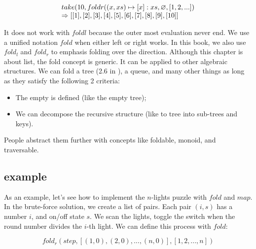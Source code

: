 \documentclass[b5paper]{article}
\begin{document}
\[
\begin{array}{l}
take(10, foldr((x, xs) \mapsto [x]:xs, \varnothing, [1, 2, ...]) \\
\Rightarrow [[1], [2], [3], [4], [5], [6], [7], [8], [9], [10]]
\end{array}
\]

It does not work with $foldl$ because the outer most evaluation never end. We use a unified notation $fold$ when either left or right works. In this book, we also use $fold_l$ and $fold_r$ to emphasis folding over the direction. Although this chapter is about list, the fold concept is generic. It can be applied to other algebraic structures. We can fold a tree (2.6 in \cite{unplugged}), a queue, and many other things as long as they satisfy the following 2 criteria:

\begin{itemize}
\item The empty is defined (like the empty tree);
\item We can decompose the recursive structure (like to tree into sub-trees and keys).
\end{itemize}

People abstract them further with concepts like foldable, monoid, and traversable.

\begin{Exercise}
\end{Exercise}

\subsection{example}

As an example, let's see how to implement the $n$-lights puzzle with $fold$ and $map$. In the brute-force solution, we create a list of pairs. Each pair $(i, s)$ has a number $i$, and on/off state $s$. We scan the lights, toggle the switch when the round number divides the $i$-th light. We can define this process with $fold$:

\[
fold_r(step, [(1, 0), (2, 0), ..., (n, 0)], [1, 2, ..., n])
\]
\end{document}
